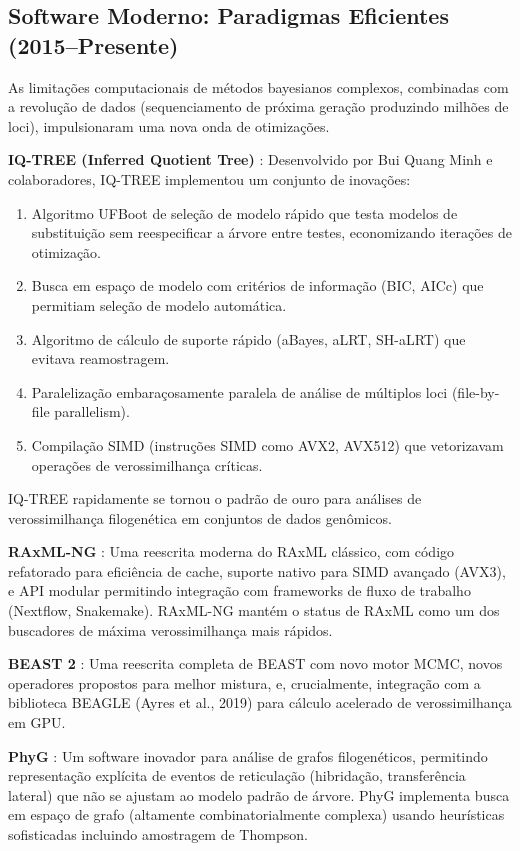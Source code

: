 \subsection{Software Moderno: Paradigmas Eficientes (2015--Presente)}

As limitações computacionais de métodos bayesianos complexos, combinadas com a revolução de dados (sequenciamento de próxima geração produzindo milhões de loci), impulsionaram uma nova onda de otimizações.

\textbf{IQ-TREE (Inferred Quotient Tree)} \parencite{minh2020}: Desenvolvido por Bui Quang Minh e colaboradores, IQ-TREE implementou um conjunto de inovações:

\begin{enumerate}
\item Algoritmo UFBoot de seleção de modelo rápido que testa modelos de substituição sem reespecificar a árvore entre testes, economizando iterações de otimização.
\item Busca em espaço de modelo com critérios de informação (BIC, AICc) que permitiam seleção de modelo automática.
\item Algoritmo de cálculo de suporte rápido (aBayes, aLRT, SH-aLRT) que evitava reamostragem.
\item Paralelização embaraçosamente paralela de análise de múltiplos loci (file-by-file parallelism).
\item Compilação SIMD (instruções SIMD como AVX2, AVX512) que vetorizavam operações de verossimilhança críticas.
\end{enumerate}

IQ-TREE rapidamente se tornou o padrão de ouro para análises de verossimilhança filogenética em conjuntos de dados genômicos.

\textbf{RAxML-NG} \parencite{kozlov2019}: Uma reescrita moderna do RAxML clássico, com código refatorado para eficiência de cache, suporte nativo para SIMD avançado (AVX3), e API modular permitindo integração com frameworks de fluxo de trabalho (Nextflow, Snakemake). RAxML-NG mantém o status de RAxML como um dos buscadores de máxima verossimilhança mais rápidos.

\textbf{BEAST 2} \parencite{bouckaert2019}: Uma reescrita completa de BEAST com novo motor MCMC, novos operadores propostos para melhor mistura, e, crucialmente, integração com a biblioteca BEAGLE (Ayres et al., 2019) para cálculo acelerado de verossimilhança em GPU.

\textbf{PhyG} \parencite{wheeler2024a}: Um software inovador para análise de grafos filogenéticos, permitindo representação explícita de eventos de reticulação (hibridação, transferência lateral) que não se ajustam ao modelo padrão de árvore. PhyG implementa busca em espaço de grafo (altamente combinatorialmente complexa) usando heurísticas sofisticadas incluindo amostragem de Thompson.

